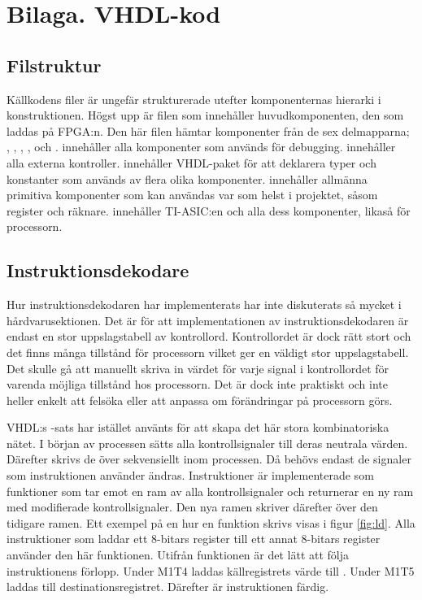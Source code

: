 \documentclass[main.tex]{subfiles}
\begin{document}
\section{Bilaga. VHDL-kod}

\subsection{Filstruktur}
Källkodens filer är ungefär strukturerade utefter komponenternas hierarki i
konstruktionen. Högst upp är filen  som innehåller
huvudkomponenten, den som laddas på FPGA:n. Den här filen hämtar komponenter
från de sex delmapparna; , , , ,
 och .  innehåller alla komponenter som används
för debugging.  innehåller alla externa kontroller. 
innehåller VHDL-paket för att deklarera typer och konstanter som används av
flera olika komponenter.  innehåller allmänna primitiva komponenter
som kan användas var som helst i projektet, såsom register och räknare.
 innehåller TI-ASIC:en och alla dess komponenter,  likaså
för processorn.

\subsection{Instruktionsdekodare}
Hur instruktionsdekodaren har implementerats har inte diskuterats så mycket i
hårdvaru\-sektionen. Det är för att implementationen av instruktionsdekodaren
är endast en stor uppslagstabell av kontrollord. Kontrollordet är dock rätt
stort och det finns många tillstånd för processorn vilket ger en väldigt stor
uppslagstabell. Det skulle gå att manuellt skriva in värdet för varje signal i
kontrollordet för varenda möjliga tillstånd hos processorn. Det är dock inte
praktiskt och inte heller enkelt att felsöka eller att anpassa om förändringar
på processorn görs.

VHDL:s -sats har istället använts för att skapa det här stora
kombinatoriska nätet. I början av processen sätts alla kontrollsignaler till
deras neutrala värden. Därefter skrivs de över sekvensiellt inom processen. Då
behövs endast de signaler som instruktionen använder ändras. Instruktioner är
implementerade som funktioner som tar emot en ram av alla kontrollsignaler och
returnerar en ny ram med modifierade kontrollsignaler. Den nya ramen skriver
därefter över den tidigare ramen. Ett exempel på en hur en funktion skrivs
visas i figur \ref{fig:ld}. Alla instruktioner som laddar ett 8-bitars register
till ett annat 8-bitars register använder den här funktionen. Utifrån
funktionen är det lätt att följa instruktionens förlopp. Under M1T4 laddas
källregistrets värde till . Under M1T5 laddas  till
destinationsregistret. Därefter är instruktionen färdig.
\end{document}
